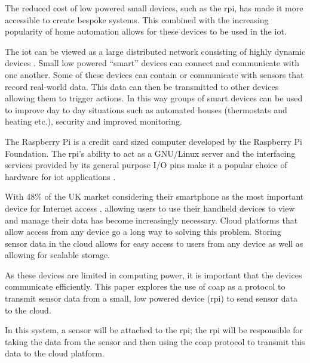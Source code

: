 The reduced cost of low powered small devices, such as the \gls{rpi}, has made it 
more accessible to create bespoke systems. 
This combined with the increasing popularity of home automation allows for these 
devices to be used in the \acrfull{iot}.

The \gls{iot} can be viewed as a large distributed network consisting of highly 
dynamic devices \citep{miorandi_internet_2012}. Small low powered ``smart'' devices 
can connect and communicate with one another. Some of these devices can contain or 
communicate with sensors that record real-world data. This data can then be 
transmitted to other devices allowing them to trigger actions. In this way groups 
of smart devices can be used to improve day to day situations such as automated 
houses (thermostats and heating etc.), security and improved monitoring.

The Raspberry Pi \citep{pi_model_2018} is a credit card sized 
computer developed by the Raspberry Pi Foundation. 
The \gls{rpi}'s ability to act as a GNU/Linux server and the interfacing services 
provided by its general purpose I/O pins make it a popular 
choice of hardware for \gls{iot} applications \citep{kumar_iot_2016}.

With 48\% of the UK market considering their smartphone as the most important 
device for Internet access \citep{ofcom_communications_2018}, allowing users to use 
their handheld devices to view and manage their data has become increasingly 
necessary. Cloud platforms that allow access from any device go a long way to 
solving this problem. Storing sensor data in the cloud allows for easy access to 
users from any device as well as allowing for scalable storage.

As these devices are limited in computing power, it is important that the devices 
communicate efficiently. 
This paper explores the use of \gls{coap} as a protocol to transmit sensor data 
from a small, low powered device (\gls{rpi}) to send sensor data to the cloud.

In this system, a sensor will be attached to the \gls{rpi}; the \gls{rpi} will 
be responsible for taking the data from the sensor and then 
using the \gls{coap} protocol to transmit this data to the cloud platform.